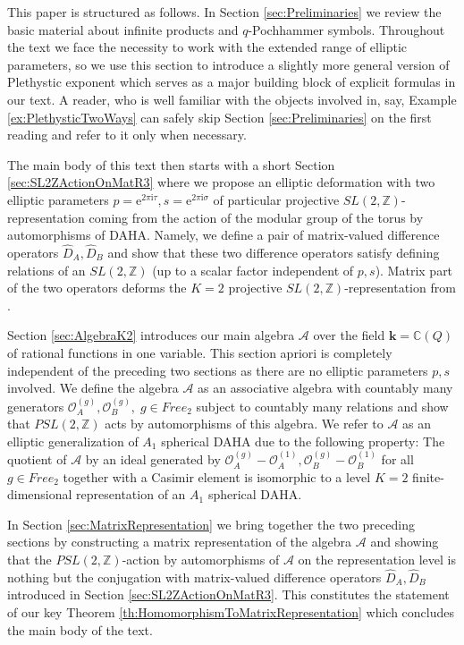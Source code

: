 \documentclass{amsart}
\newcommand{\Oa}{\mathcal O_A}
\newcommand{\Ob}{\mathcal O_B}
\begin{document}
This paper is structured as follows. In Section \ref{sec:Preliminaries} we review the basic material about infinite products and $q$-Pochhammer symbols. Throughout the text we face the necessity to work with the extended range of elliptic parameters, so we use this section to introduce a slightly more general version of Plethystic exponent which serves as a major building block of explicit formulas in our text. A reader, who is well familiar with the objects involved in, say, Example \ref{ex:PlethysticTwoWays} can safely skip Section \ref{sec:Preliminaries} on the first reading and refer to it only when necessary.

The main body of this text then starts with a short Section \ref{sec:SL2ZActionOnMatR3} where we propose an elliptic deformation with two elliptic parameters $p=\mathrm e^{2\pi\mathrm i\tau},s=\mathrm e^{2\pi\mathrm i\sigma}$ of particular projective $SL(2,\mathbb Z)$-representation coming from the action of the modular group of the torus by automorphisms of DAHA. Namely, we define a pair of matrix-valued difference operators $\widehat D_A,\widehat D_B$ and show that these two difference operators satisfy defining relations of an $SL(2,\mathbb Z)$ (up to a scalar factor independent of $p,s$). Matrix part of the two operators deforms the $K=2$ projective $SL(2,\mathbb Z)$-representation from \cite{AganagicShakirov'2015}.

Section \ref{sec:AlgebraK2} introduces our main algebra $\mathcal A$ over the field $\mathbf k=\mathbb C(Q)$ of rational functions in one variable. This section apriori is completely independent of the preceding two sections as there are no elliptic parameters $p,s$ involved. We define the algebra $\mathcal A$ as an associative algebra with countably many generators $\Oa^{(g)},\Ob^{(g)},\;g\in Free_2$ subject to countably many relations and show that $PSL(2,\mathbb Z)$ acts by automorphisms of this algebra. We refer to $\mathcal A$ as an elliptic generalization of $A_1$ spherical DAHA due to the following property: The quotient of $\mathcal A$ by an ideal generated by $\Oa^{(g)}-\Oa^{(1)},\Ob^{(g)}-\Ob^{(1)}$ for all $g\in Free_2$ together with a Casimir element is isomorphic to a level $K=2$ finite-dimensional representation of an $A_1$ spherical DAHA.

In Section \ref{sec:MatrixRepresentation} we bring together the two preceding sections by constructing a matrix representation of the algebra $\mathcal A$ and showing that the $PSL(2,\mathbb Z)$-action by automorphisms of $\mathcal A$ on the representation level is nothing but the conjugation with matrix-valued difference operators $\widehat D_A,\widehat D_B$ introduced in Section \ref{sec:SL2ZActionOnMatR3}. This constitutes the statement of our key Theorem \ref{th:HomomorphismToMatrixRepresentation} which concludes the main body of the text.
\end{document}
